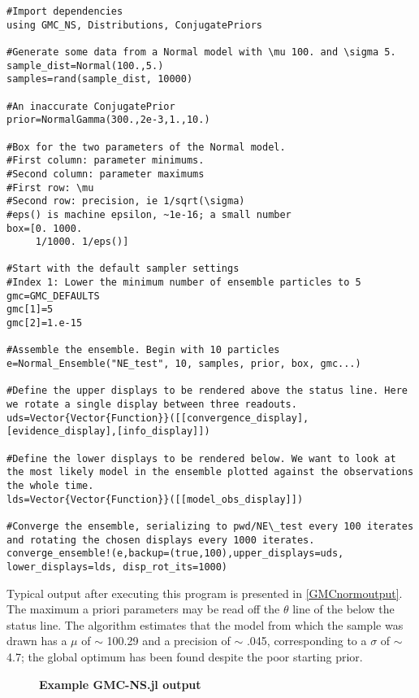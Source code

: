 \begin{verbatim}
#Import dependencies
using GMC_NS, Distributions, ConjugatePriors

#Generate some data from a Normal model with \mu 100. and \sigma 5. 
sample_dist=Normal(100.,5.)
samples=rand(sample_dist, 10000)

#An inaccurate ConjugatePrior
prior=NormalGamma(300.,2e-3,1.,10.) 

#Box for the two parameters of the Normal model.
#First column: parameter minimums.
#Second column: parameter maximums
#First row: \mu
#Second row: precision, ie 1/sqrt(\sigma)
#eps() is machine epsilon, ~1e-16; a small number
box=[0. 1000.
     1/1000. 1/eps()]

#Start with the default sampler settings
#Index 1: Lower the minimum number of ensemble particles to 5
gmc=GMC_DEFAULTS
gmc[1]=5
gmc[2]=1.e-15

#Assemble the ensemble. Begin with 10 particles
e=Normal_Ensemble("NE_test", 10, samples, prior, box, gmc...)

#Define the upper displays to be rendered above the status line. Here we rotate a single display between three readouts.
uds=Vector{Vector{Function}}([[convergence_display],[evidence_display],[info_display]])

#Define the lower displays to be rendered below. We want to look at the most likely model in the ensemble plotted against the observations the whole time.
lds=Vector{Vector{Function}}([[model_obs_display]])

#Converge the ensemble, serializing to pwd/NE\_test every 100 iterates and rotating the chosen displays every 1000 iterates.
converge_ensemble!(e,backup=(true,100),upper_displays=uds, lower_displays=lds, disp_rot_its=1000)
\end{verbatim}

Typical output after executing this program is presented in \autoref{GMCnormoutput}. The maximum a priori parameters may be read off the $\theta$ line of the  below the status line. The algorithm estimates that the model from which the sample was drawn has a $\mu$ of $\sim$ 100.29 and a precision of $\sim$ .045, corresponding to a $\sigma$ of $\sim$ 4.7; the global optimum has been found despite the poor starting prior.

\begin{figure}[!h]
    \caption{{\bf Example GMC-NS.jl output}}
    \label{GMCnormoutput}
\end{figure}

